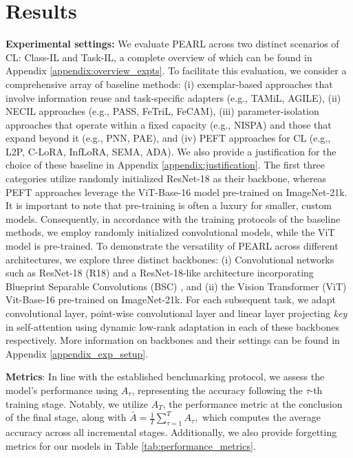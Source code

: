 \documentclass[10pt]{article} %
\begin{document}
\section{ Results}

\textbf{Experimental settings:} We evaluate PEARL across two distinct scenarios of CL: Class-IL and Task-IL, a complete overview of which can be found in Appendix \ref{appendix:overview_expts}. To facilitate this evaluation, we consider a comprehensive array of baseline methods: (i) exemplar-based approaches that involve information reuse and task-specific adapters (e.g., TAMiL, AGILE), (ii) NECIL approaches (e.g., PASS, FeTriL, FeCAM), (iii) parameter-isolation approaches that operate within a fixed capacity (e.g., NISPA) and those that expand beyond it (e.g., PNN, PAE), and (iv) PEFT approaches for CL (e.g., L2P, C-LoRA, InfLoRA, SEMA, ADA). We also provide a justification for the choice of these baseline in Appendix \ref{appendix:justification}. The first three categories utilize randomly initialized ResNet-18 as their backbone, whereas PEFT approaches leverage the ViT-Base-16 model pre-trained on ImageNet-21k. It is important to note that pre-training is often a luxury for smaller, custom models. Consequently, in accordance with the training protocols of the baseline methods, we employ randomly initialized convolutional models, while the ViT model is pre-trained. To demonstrate the versatility of PEARL across different architectures, we  explore three distinct backbones: (i) Convolutional networks such as ResNet-18 (R18) and a ResNet-18-like architecture incorporating Blueprint Separable Convolutions (BSC) \citep{li2022blueprint}, and (ii) the Vision Transformer (ViT) Vit-Base-16 pre-trained on ImageNet-21k. For each subsequent task, we adapt convolutional layer, point-wise convolutional layer and linear layer projecting \textit{key} in self-attention using dynamic low-rank adaptation  in each of these backbones respectively.  More information on backbones and their settings can be found in Appendix \ref{appendix_exp_setup}. 

\textbf{Metrics}: In line with the established benchmarking protocol, we assess the model's performance using \( A_{\tau} \), representing the accuracy following the \( \tau \)-th training stage. Notably, we utilize \( A_T \), the performance metric at the conclusion of the final stage, along with $\bar{A} = \frac{1}{T} \sum_{\tau=1}^{T} A_{\tau},$
which computes the average accuracy across all incremental stages. Additionally, we also provide forgetting metrics for our models in Table \ref{tab:performance_metrics}.
\end{document}
